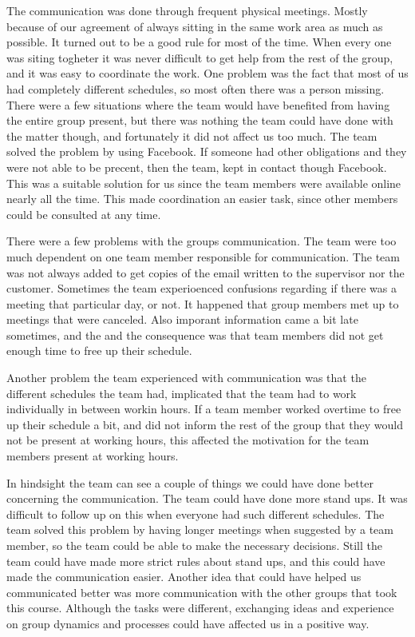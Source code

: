 The communication was done through frequent physical meetings. Mostly because of our
agreement of always sitting in the same work area as much as possible. It turned out to be a good rule for most of the time. When every one was siting togheter it was never difficult to get help from the rest of the group, and it was easy to coordinate the work. One problem was the fact that most of us had completely different schedules, so most often there was a person missing. There were a few situations where the team would have benefited from having the entire group present, but there was nothing the team could have done with the matter though, and fortunately it did not affect us too much. The team solved the problem by using Facebook. If someone had other obligations and they were not able to be precent, then the team, kept in contact though Facebook. This was a suitable solution for us since the team members were available online nearly all the time. This made coordination an easier task, since other members could be consulted at any time. 

There were a few problems with the groups communication. The team were too much dependent on one team member responsible for communication. The team was not always added to get copies of the email written to the supervisor nor the customer. Sometimes the team experioenced confusions regarding if there was a meeting that particular day, or not. It happened that group members met up to meetings that were canceled. Also imporant information came a bit late sometimes, and the and the consequence was that team members did not get enough time to free up their schedule.

Another problem the team experienced with communication was that the different schedules the team had, implicated that the team had to work individually in between workin hours. If a team member worked overtime to free up their schedule a bit, and did not inform the rest of the group that they would not be present at working hours, this affected the motivation for the team members present at working hours. 


In hindsight the team can see a couple of things we could have done better concerning the communication. The team could have done more stand ups. It was difficult to follow up on this when everyone had such different schedules. The team solved this problem by having longer meetings when suggested by a team member, so the team could be able to make the necessary decisions. Still the team could have made more strict rules about stand ups, and this could have made the communication easier.
Another idea that could have helped us communicated better was more communication with the other
groups that took this course. Although the tasks were different, exchanging ideas and experience on group dynamics and processes could have affected us in a positive way. 

